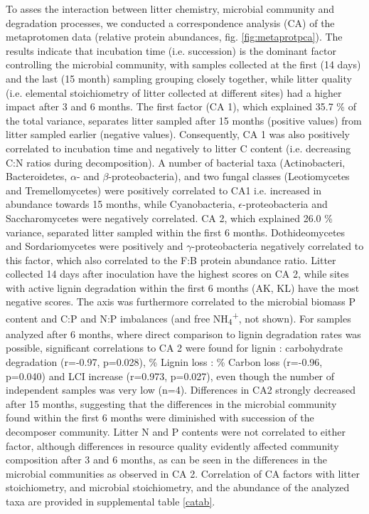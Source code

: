 To asses the interaction between litter chemistry, microbial community and degradation processes, we conducted a correspondence analysis (CA) of the metaprotomen data (relative protein abundances, fig. \ref{fig:metaprotpca}). The results indicate that incubation time (i.e. succession) is the dominant factor controlling the microbial community, with samples collected at the first (14 days) and the last (15 month) sampling grouping closely together, while litter quality (i.e. elemental stoichiometry of litter collected at different sites) had a higher impact after 3 and 6 months. The first factor (CA 1), which explained 35.7 \% of the total variance, separates litter sampled after 15 months (positive values) from litter sampled earlier (negative values). Consequently, CA 1 was also positively correlated to incubation time and negatively to litter C content (i.e. decreasing C:N ratios during decomposition). A number of bacterial taxa (Actinobacteri, Bacteroidetes, $\alpha$- and $\beta$-proteobacteria), and two 
fungal classes (Leotiomycetes and Tremellomycetes) were positively correlated to CA1 i.e. increased in abundance towards 15 months, while Cyanobacteria, $\epsilon$-proteobacteria and Saccharomycetes were negatively correlated. CA 2, which explained 26.0 \% variance, separated litter sampled within the first 6 months. Dothideomycetes and Sordariomycetes were positively and $\gamma$-proteobacteria negatively correlated to this factor, which also correlated to the F:B protein abundance ratio. Litter collected 14 days after inoculation have the highest scores on CA 2, while sites with active lignin degradation within the first 6 months (AK, KL) have the most negative scores. The axis was furthermore correlated to the microbial biomass P content and C:P and N:P imbalances (and free NH\textsubscript{4}\textsuperscript{+}, not shown). For samples analyzed after 6 months, where direct comparison to lignin degradation rates was possible, significant correlations to CA 2 were found for lignin : carbohydrate 
degradation (r=-0.97, p=0.028), \% Lignin loss : \% Carbon loss (r=-0.96, p=0.040) and  LCI increase (r=0.973, p=0.027), even though the number of independent samples was very low (n=4). Differences in CA2 strongly decreased after 15 months, suggesting that the differences in the microbial community found within the first 6 months were diminished with succession of the decomposer community. Litter N and P contents were not correlated to either factor, although differences in resource quality evidently affected community composition after 3 and 6 months, as can be seen in the differences in the microbial communities as observed in CA 2. Correlation of CA factors with litter stoichiometry, and microbial stoichiometry, and the abundance of the analyzed taxa are provided in supplemental table \ref{catab}.